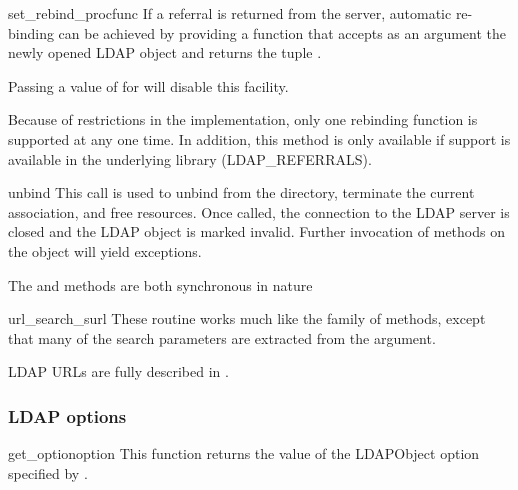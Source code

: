 
\begin{methoddesc}{set_rebind_proc}{func}
If a referral is returned from the server, automatic
re-binding can be achieved by providing a function that accepts as an argument
the newly opened LDAP object and returns the tuple .

Passing a value of  for  will disable
this facility. 

Because of restrictions in the implementation, only one
rebinding function is supported at any one time.
In addition, this method is only
available if support is available in the underlying library (LDAP_REFERRALS).
\end{methoddesc}


\begin{methoddesc}[int]{unbind}{}
This call is used to unbind from the directory, terminate the current
association, and free resources. Once called, the connection to the
LDAP server is closed and the LDAP object is marked invalid.
Further invocation of methods on the object will yield exceptions.

The  and  methods are both
synchronous in nature
\end{methoddesc}


\begin{methoddesc}[LDAP]{url_search_s}{url }
These routine works much like the  family of methods, 
except that many of the search parameters are extracted from the 
argument.

LDAP URLs are fully described in .
\end{methoddesc}

\subsubsection{LDAP options}

\begin{methoddesc}[LDAP]{get_option}{option} %
  This function returns the value of the LDAPObject option
  specified by .
\end{methoddesc}

